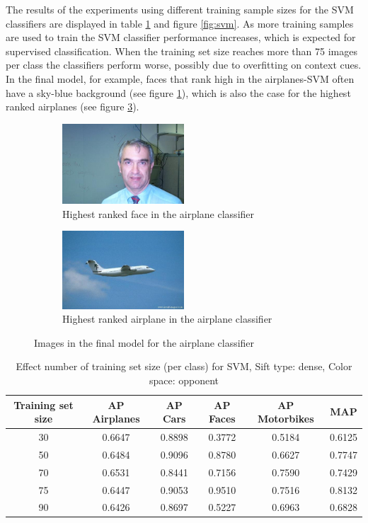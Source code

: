 The results of the experiments using different training sample sizes for the SVM classifiers are displayed in table \ref{tab:svm} and figure \ref{fig:svm}. As more training samples are used to train the SVM classifier performance increases, which is expected for supervised classification. When the training set size reaches more than 75 images per class the classifiers perform worse, possibly due to overfitting on context cues. In the final model, for example, faces that rank high in the airplanes-SVM often have a sky-blue background (see figure \ref{photo:man}), which is also the case for the highest ranked airplanes (see figure \ref{photo:airplane}).
\begin{figure}[H]
\begin{subfigure}[b]{0.5\textwidth}
\includegraphics[width=0.5\textwidth]{img003}
\caption{Highest ranked face in the airplane classifier}
\label{photo:man}
\end{subfigure}
\begin{subfigure}[b]{0.5\textwidth}
\includegraphics[width=0.5\textwidth]{img010}
\caption{Highest ranked airplane in the airplane classifier}
\label{photo:airplane}
\end{subfigure}
\caption{Images in the final model for the airplane classifier}
\end{figure}
  
\begin{table}[H]
\begin{tabular}{|c|ccccc|}
\hline
\textbf{Training set size} & \textbf{AP Airplanes} & \textbf{AP Cars} & \textbf{AP Faces} & \textbf{AP Motorbikes} & \textbf{MAP}\\
\hline
30 & 0.6647 & 0.8898 & 0.3772 & 0.5184& 0.6125\\
50 & 0.6484 & 0.9096 & 0.8780 & 0.6627 & 0.7747\\
70 & 0.6531 & 0.8441 & 0.7156 & 0.7590 & 0.7429\\
75 & 0.6447 & 0.9053 & 0.9510 & 0.7516 & 0.8132\\
90 & 0.6426 & 0.8697 & 0.5227 & 0.6963 & 0.6828\\
\hline
\end{tabular}
\caption{Effect number of training set size (per class) for SVM, Sift type: dense, Color space: opponent}
\label{tab:svm}
\end{table}

